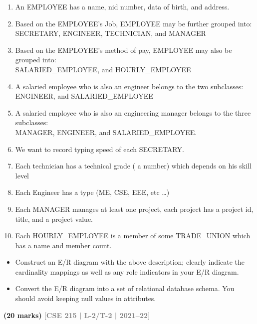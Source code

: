 \documentclass[12pt]{article}
\newcommand{\yr}[1]{\hfill\textcolor{gray}{\small\textbf{[#1]}}}
\newcommand{\mk}[1]{\textcolor{orange!70!black}{\small\textbf{(#1 marks)}}}
\begin{document}
\begin{enumerate}
\begin{enumerate}[label=(\roman*)]
    \item An EMPLOYEE has a name, nid number, data of birth, and address.
    \item Based on the EMPLOYEE's Job, EMPLOYEE may be further grouped into:\\
    SECRETARY, ENGINEER, TECHNICIAN, and MANAGER
    \item Based on the EMPLOYEE's method of pay, EMPLOYEE may also be grouped into:\\
    SALARIED\_EMPLOYEE, and HOURLY\_EMPLOYEE
    \item A salaried employee who is also an engineer belongs to the two subclasses:\\
    ENGINEER, and SALARIED\_EMPLOYEE
    \item A salaried employee who is also an engineering manager belongs to the three subclasses:\\
    MANAGER, ENGINEER, and SALARIED\_EMPLOYEE.
    \item We want to record typing speed of each SECRETARY.
    \item Each technician has a technical grade ( a number) which depends on his skill level
    \item Each Engineer has a type (ME, CSE, EEE, etc \dots)
    \item Each MANAGER manages at least one project, each project has a project id, title, and a project value.
    \item Each HOURLY\_EMPLOYEE is a member of some TRADE\_UNION which has a name and member count.
\end{enumerate}

\begin{itemize}
    \item Construct an E/R diagram with the above description; clearly indicate the cardinality mappings as well as any role indicators in your E/R diagram.
    \item Convert the E/R diagram into a set of relational database schema. You should avoid keeping null values in attributes.
\end{itemize}
\mk{20} \yr{CSE 215 | L-2/T-2 | 2021--22}




\end{enumerate}
\end{document}
